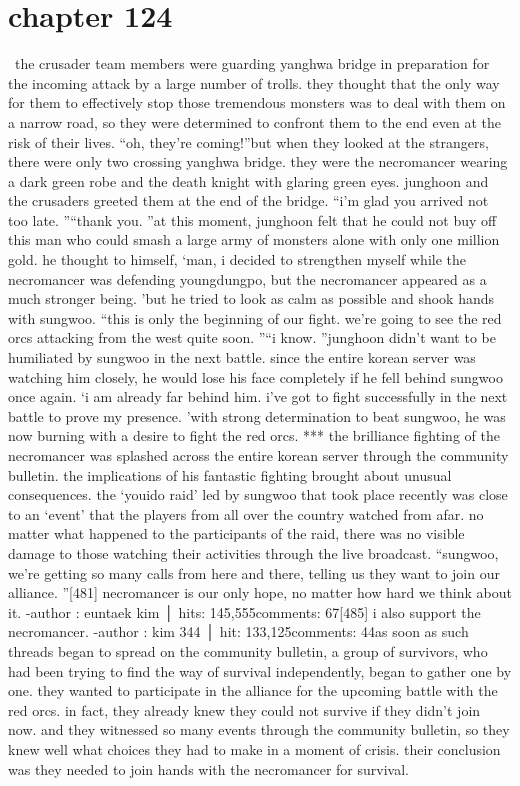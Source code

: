 \section{chapter 124}






 the crusader team members were guarding yanghwa bridge in preparation for the incoming attack by a large number of trolls.
they thought that the only way for them to effectively stop those tremendous monsters was to deal with them on a narrow road, so they were determined to confront them to the end even at the risk of their lives.
“oh, they’re coming!”but when they looked at the strangers, there were only two crossing yanghwa bridge.
 they were the necromancer wearing a dark green robe and the death knight with glaring green eyes.
junghoon and the crusaders greeted them at the end of the bridge.
“i’m glad you arrived not too late.
”“thank you.
”at this moment, junghoon felt that he could not buy off this man who could smash a large army of monsters alone with only one million gold.
he thought to himself, ‘man, i decided to strengthen myself while the necromancer was defending youngdungpo, but the necromancer appeared as a much stronger being.
’but he tried to look as calm as possible and shook hands with sungwoo.
“this is only the beginning of our fight.
 we’re going to see the red orcs attacking from the west quite soon.
”“i know.
”junghoon didn’t want to be humiliated by sungwoo in the next battle.
 since the entire korean server was watching him closely, he would lose his face completely if he fell behind sungwoo once again.
‘i am already far behind him.
 i’ve got to fight successfully in the next battle to prove my presence.
’with strong determination to beat sungwoo, he was now burning with a desire to fight the red orcs.
***
the brilliance fighting of the necromancer was splashed across the entire korean server through the community bulletin.
 the implications of his fantastic fighting brought about unusual consequences.
the ‘youido raid’ led by sungwoo that took place recently was close to an ‘event’ that the players from all over the country watched from afar.
no matter what happened to the participants of the raid, there was no visible damage to those watching their activities through the live broadcast.
“sungwoo, we’re getting so many calls from here and there, telling us they want to join our alliance.
”[481] necromancer is our only hope, no matter how hard we think about it.
-author : euntaek kim │ hits: 145,555comments: 67[485] i also support the necromancer.
-author : kim 344 │ hit: 133,125comments: 44as soon as such threads began to spread on the community bulletin, a group of survivors, who had been trying to find the way of survival independently, began to gather one by one.
they wanted to participate in the alliance for the upcoming battle with the red orcs.
 in fact, they already knew they could not survive if they didn’t join now.
and they witnessed so many events through the community bulletin, so they knew well what choices they had to make in a moment of crisis.
their conclusion was they needed to join hands with the necromancer for survival.

